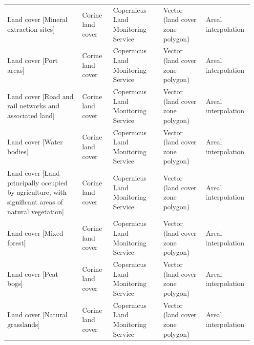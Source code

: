 \documentclass[fleqn,10pt]{wlscirep}
\begin{document}
\begin{longtable}{p{}p{}p{}p{}p{}}
                                                                    Land cover [Mineral extraction sites] &                  Corine land cover  &                                         Copernicus Land Monitoring Service  &  Vector (land cover zone polygon)  &                            Areal interpolation  \\
                                                                                Land cover [Port areas] &                  Corine land cover  &                                         Copernicus Land Monitoring Service  &  Vector (land cover zone polygon)  &                            Areal interpolation  \\
                                                Land cover [Road and rail networks and associated land] &                  Corine land cover  &                                         Copernicus Land Monitoring Service  &  Vector (land cover zone polygon)  &                            Areal interpolation  \\
                                                                                Land cover [Water bodies] &                  Corine land cover  &                                         Copernicus Land Monitoring Service  &  Vector (land cover zone polygon)  &                            Areal interpolation  \\
    Land cover [Land principally occupied by agriculture, with significant areas of natural vegetation] &                  Corine land cover  &                                         Copernicus Land Monitoring Service  &  Vector (land cover zone polygon)  &                            Areal interpolation  \\
                                                                                Land cover [Mixed forest] &                  Corine land cover  &                                         Copernicus Land Monitoring Service  &  Vector (land cover zone polygon)  &                            Areal interpolation  \\
                                                                                    Land cover [Peat bogs] &                  Corine land cover  &                                         Copernicus Land Monitoring Service  &  Vector (land cover zone polygon)  &                            Areal interpolation  \\
                                                                        Land cover [Natural grasslands] &                  Corine land cover  &                                         Copernicus Land Monitoring Service  &  Vector (land cover zone polygon)  &                            Areal interpolation  \\

\end{longtable}
\end{document}
